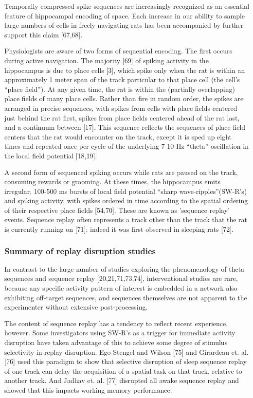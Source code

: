 \documentclass[]{article}
\begin{document}
Temporally compressed spike sequences are increasingly recognized as an
essential feature of hippocampal encoding of space. Each increase in our
ability to sample large numbers of cells in freely navigating rats has
been accompanied by further support this claim {[}67,68{]}.

Physiologists are aware of two forms of sequential encoding. The first
occurs during active navigation. The majority {[}69{]} of spiking
activity in the hippocampus is due to place cells {[}3{]}, which spike
only when the rat is within an approximately 1 meter span of the track
particular to that place cell (the cell's ``place field''). At any given
time, the rat is within the (partially overlapping) place fields of many
place cells. Rather than fire in random order, the spikes are arranged
in precise sequences, with spikes from cells with place fields centered
just behind the rat first, spikes from place fields centered ahead of
the rat last, and a continuum between {[}17{]}. This sequence reflects
the sequences of place field centers that the rat would encounter on the
track, except it is sped up eight times and repeated once per cycle of
the underlying 7-10 Hz ``theta'' oscillation in the local field
potential {[}18,19{]}.

A second form of sequenced spiking occurs while rats are paused on the
track, consuming rewards or grooming. At these times, the hippocampus
emits irregular, 100-500 ms bursts of local field potential ``sharp
wave-ripples''(SW-R's) and spiking activity, with spikes ordered in time
according to the spatial ordering of their respective place fields
{[}54,70{]}. These are known as 'sequence replay' events. Sequence
replay often represents a track other than the track that the rat is
currently running on {[}71{]}; indeed it was first observed in sleeping
rats {[}72{]}.

\subsubsection{Summary of replay disruption studies}

In contrast to the large number of studies exploring the phenomenology
of theta sequences and sequence replay {[}20,21,71,73,74{]},
interventional studies are rare, because any specific activity pattern
of interest is embedded in a network also exhibiting off-target
sequences, and sequences themselves are not apparent to the experimenter
without extensive post-processing.

The content of sequence replay has a tendency to reflect recent
experience, however. Some investigators using SW-R's as a trigger for
immediate activity disruption have taken advantage of this to achieve
some degree of stimulus selectivity in replay disruption. Ego-Stengel
and Wilson {[}75{]} and Girardeau et. al. {[}76{]} used this paradigm to
show that selective disruption of sleep sequence replay of one track can
delay the acquisition of a spatial task on that track, relative to
another track. And Jadhav et. al. {[}77{]} disrupted all awake sequence
replay and showed that this impacts working memory performance.
\end{document}
